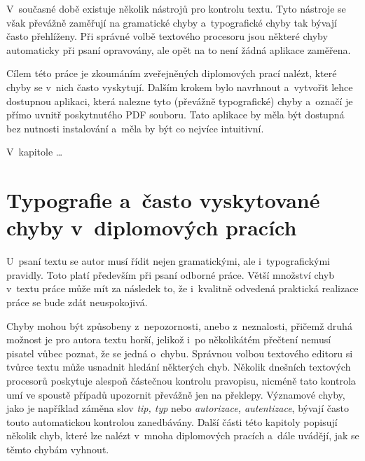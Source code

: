 V~současné době existuje několik nástrojů pro kontrolu textu. Tyto nástroje se
však převážně zaměřují na gramatické chyby a~typografické chyby tak bývají často
přehlíženy. Při správné volbě textového procesoru jsou některé chyby automaticky
při psaní opravovány, ale opět na to není žádná aplikace zaměřena.

Cílem této práce je zkoumáním zveřejněných diplomových prací nalézt, které chyby
se v~nich často vyskytují. Dalším krokem bylo navrhnout a~vytvořit lehce
dostupnou aplikaci, která nalezne tyto (převážně typografické) chyby a~označí
je přímo uvnitř poskytnutého PDF souboru. Tato aplikace by měla být dostupná bez
nutnosti instalování a~měla by být co nejvíce intuitivní.

V~kapitole \dots {}


\dummyText

\dummyText[2]

\dummyShortText[15]





\chapter{Typografie a~často vyskytované chyby v~diplomových pracích} \label{frequent_mistakes}
U~psaní textu se autor musí řídit nejen gramatickými, ale i~typografickými
pravidly. Toto platí především při psaní odborné práce. Větší množství chyb
v~textu práce může mít za následek to, že i~kvalitně odvedená praktická realizace
práce se bude zdát neuspokojivá.

Chyby mohou být způsobeny z~nepozornosti, anebo z~neznalosti, přičemž druhá možnost
je pro autora textu horší, jelikož i~po několikátém přečtení nemusí pisatel vůbec
poznat, že se jedná o~chybu. Správnou volbou textového editoru si tvůrce textu
může usnadnit hledání některých chyb. Několik dnešních textových procesorů poskytuje
alespoň částečnou kontrolu pravopisu, nicméně tato kontrola umí ve spoustě případů
upozornit převážně jen na překlepy. Významové chyby, jako je například záměna slov
\emph{tip, typ} nebo \emph{autorizace, autentizace}, bývají často touto
automatickou kontrolou zanedbávány. Další části této kapitoly popisují několik
chyb, které lze nalézt v~mnoha diplomových pracích a~dále uvádějí, jak se těmto
chybám vyhnout.


